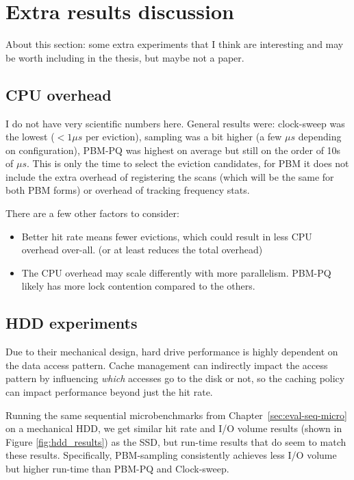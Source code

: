 

\chapter{Extra results discussion}
About this section: some extra experiments that I think are interesting and may be worth including in the thesis, but maybe not a paper.

\section{CPU overhead}
I do not have very scientific numbers here. General results were: clock-sweep was the lowest ($< 1\mu s$ per eviction), sampling was a bit higher (a few $\mu s$ depending on configuration), PBM-PQ was highest on average but still on the order of 10s of $\mu s$. This is only the time to select the eviction candidates, for PBM it does not include the extra overhead of registering the scans (which will be the same for both PBM forms) or overhead of tracking frequency stats.

There are a few other factors to consider:
\begin{itemize}
    \item Better hit rate means fewer evictions, which could result in less CPU overhead over-all. (or at least reduces the total overhead)
    \item The CPU overhead may scale differently with more parallelism. PBM-PQ likely has more lock contention compared to the others.
\end{itemize}

\section{HDD experiments}
Due to their mechanical design, hard drive performance is highly dependent on the data access pattern. Cache management can indirectly impact the access pattern by influencing \textit{which} accesses go to the disk or not, so the caching policy can impact performance beyond just the hit rate.

Running the same sequential microbenchmarks from Chapter~\ref{sec:eval-seq-micro} on a mechanical HDD, we get similar hit rate and I/O volume results (shown in Figure \ref{fig:hdd_results}) as the SSD, but run-time results that do seem to match these results. Specifically, PBM-sampling consistently achieves less I/O volume but higher run-time than PBM-PQ and Clock-sweep.

